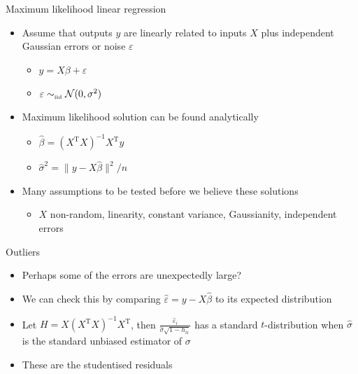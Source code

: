 \begin{frame}{Maximum likelihood linear regression}
  \begin{itemize}
    \item Assume that outputs $y$ are linearly related to inputs $X$ plus independent Gaussian errors or noise $\varepsilon$
    \begin{itemize}
      \item $y = X\beta + \varepsilon$
      \item $\varepsilon \sim_{\mbox{\tiny iid}} \mathcal{N}(0, \sigma^2)$
    \end{itemize}
    \pause
    \vspace{\baselineskip}
    \item Maximum likelihood solution can be found analytically
    \begin{itemize}
      \item $\hat\beta = (X^{\textrm{T}}X)^{-1}X^{\textrm{T}}y$
      \item $\hat\sigma^2 = \|y - X \hat\beta\|^2 / n$
    \end{itemize}
    \pause
    \vspace{\baselineskip}
    \item Many assumptions to be tested before we believe these solutions
    \begin{itemize}
      \item \eg $X$ non-random, linearity, constant variance, Gaussianity, independent errors
    \end{itemize}
  \end{itemize}
\end{frame}

\begin{frame}{Outliers}
  \begin{itemize}
    \item Perhaps some of the errors are unexpectedly large?
    \pause
    \vspace{\baselineskip}
    \item We can check this by comparing $\hat\varepsilon = y - X\hat\beta$ to its expected distribution
    \pause
    \vspace{\baselineskip}
    \item Let $H = X(X^{\textrm{T}}X)^{-1}X^{\textrm{T}}$, then $\frac{\hat\varepsilon_i}{\hat\sigma\sqrt{1 - h_{ii}}}$ has a standard $t$-distribution when $\hat\sigma$ is the standard unbiased estimator of $\sigma$
    \pause
    \vspace{\baselineskip}
    \item These are the studentised residuals
  \end{itemize}
\end{frame}

